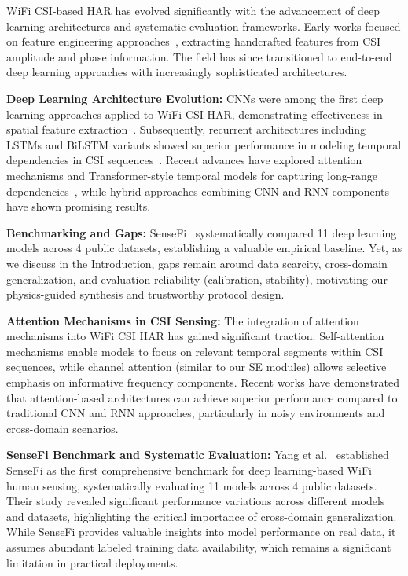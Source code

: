 \documentclass[journal]{IEEEtran}
\begin{document}
WiFi CSI-based HAR has evolved significantly with the advancement of deep learning architectures and systematic evaluation frameworks. Early works focused on feature engineering approaches~\cite{csi_basics2016}, extracting handcrafted features from CSI amplitude and phase information. The field has since transitioned to end-to-end deep learning approaches with increasingly sophisticated architectures.

\textbf{Deep Learning Architecture Evolution:} CNNs were among the first deep learning approaches applied to WiFi CSI HAR, demonstrating effectiveness in spatial feature extraction~\cite{clnet2021}. Subsequently, recurrent architectures including LSTMs and BiLSTM variants showed superior performance in modeling temporal dependencies in CSI sequences~\cite{rewis2022}. Recent advances have explored attention mechanisms and Transformer-style temporal models for capturing long-range dependencies~\cite{gulati2020conformer,li2020tea,bertasius2021timesformer,lim2021tft,zhou2021informer}, while hybrid approaches combining CNN and RNN components have shown promising results.

\textbf{Benchmarking and Gaps:} SenseFi~\cite{yang2023sensefi} systematically compared 11 deep learning models across 4 public datasets, establishing a valuable empirical baseline. Yet, as we discuss in the Introduction, gaps remain around data scarcity, cross-domain generalization, and evaluation reliability (calibration, stability), motivating our physics-guided synthesis and trustworthy protocol design.

\textbf{Attention Mechanisms in CSI Sensing:} The integration of attention mechanisms into WiFi CSI HAR has gained significant traction. Self-attention mechanisms enable models to focus on relevant temporal segments within CSI sequences, while channel attention (similar to our SE modules) allows selective emphasis on informative frequency components. Recent works have demonstrated that attention-based architectures can achieve superior performance compared to traditional CNN and RNN approaches, particularly in noisy environments and cross-domain scenarios.

\textbf{SenseFi Benchmark and Systematic Evaluation:} Yang et al.~\cite{yang2023sensefi} established SenseFi as the first comprehensive benchmark for deep learning-based WiFi human sensing, systematically evaluating 11 models across 4 public datasets. Their study revealed significant performance variations across different models and datasets, highlighting the critical importance of cross-domain generalization. While SenseFi provides valuable insights into model performance on real data, it assumes abundant labeled training data availability, which remains a significant limitation in practical deployments.
\end{document}
